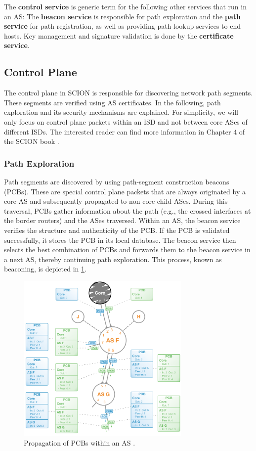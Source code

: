 The \textbf{control service} is generic term for the following other services that run in an AS:
The \textbf{beacon service} is responsible for path exploration and the \textbf{path service} for path registration, as well as providing path lookup services to end hosts.
Key management and signature validation is done by the \textbf{certificate service}.


\subsection{Control Plane}
\label{sec:control_plane}

The control plane in SCION is responsible for discovering network path segments.
These segments are verified using AS certificates.
In the following, path exploration and its security mechanisms are explained.
For simplicity, we will only focus on control plane packets within an ISD and not between core ASes of different ISDs.
The interested reader can find more information in Chapter 4 of the SCION book \cite{Perrig2022}.

\newpage
\subsubsection{Path Exploration}
Path segments are discovered by using path-segment construction beacons (PCBs).
These are special control plane packets that are always originated by a core AS and subsequently propagated to non-core child ASes.
During this traversal, PCBs gather information about the path (e.g., the crossed interfaces at the border routers) and the ASes traversed.
Within an AS, the beacon service verifies the structure and authenticity of the PCB.
If the PCB is validated successfully, it stores the PCB in its local database.
The beacon service then selects the best combination of PCBs and forwards them to the beacon service in a next AS, thereby continuing path exploration.
This process, known as beaconing, is depicted in \cref{fig:scion_path_exploration}.

\begin{figure}[h]
    \centering
    \includegraphics[width=0.75\textwidth]{figures/scion_beacon.png}
    \caption{Propagation of PCBs within an AS \cite[Section 2.3.1]{Perrig2022}.}
    \label{fig:scion_path_exploration}
\end{figure}

